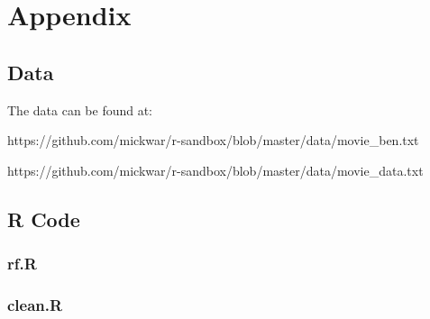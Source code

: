 \documentclass[12pt]{article}
\begin{document}










% 




\section*{Appendix}

\subsection*{Data}

The data can be found at:

https://github.com/mickwar/r-sandbox/blob/master/data/movie\_ben.txt

https://github.com/mickwar/r-sandbox/blob/master/data/movie\_data.txt

\subsection*{R Code}
\begin{tiny}
\subsubsection*{rf.R}

\subsubsection*{clean.R}

\end{tiny}
\end{document}

